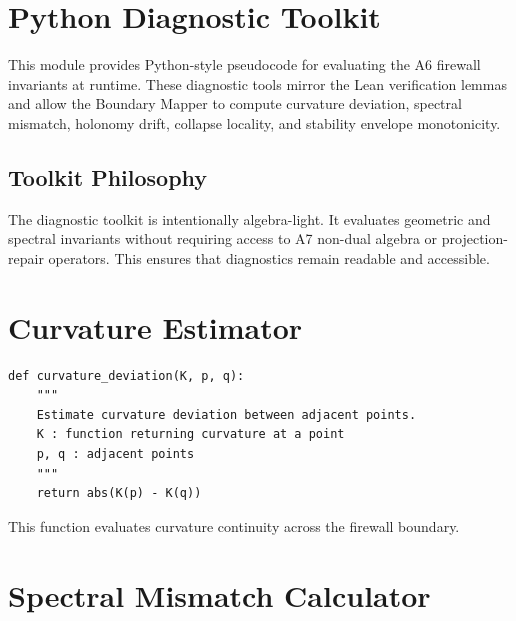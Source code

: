 
\section{Python Diagnostic Toolkit}

This module provides Python-style pseudocode for evaluating the A6 firewall
invariants at runtime. These diagnostic tools mirror the Lean verification
lemmas and allow the Boundary Mapper to compute curvature deviation, spectral
mismatch, holonomy drift, collapse locality, and stability envelope
monotonicity.

\subsection{Toolkit Philosophy}

The diagnostic toolkit is intentionally algebra-light. It evaluates geometric
and spectral invariants without requiring access to A7 non-dual algebra or
projection-repair operators. This ensures that diagnostics remain readable
and accessible.

\section{Curvature Estimator}

\begin{verbatim}
def curvature_deviation(K, p, q):
    """
    Estimate curvature deviation between adjacent points.
    K : function returning curvature at a point
    p, q : adjacent points
    """
    return abs(K(p) - K(q))
\end{verbatim}

This function evaluates curvature continuity across the firewall boundary.

\section{Spectral Mismatch Calculator}

